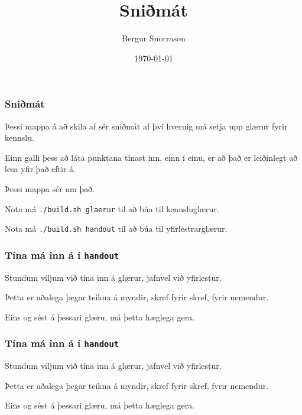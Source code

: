 \title{Sniðmát}
\author{Bergur Snorrason}
\date{\today}



\frame{\titlepage}

{
	\frametitle{Sniðmát}
	{
		\item<1-> Þessi mappa á að skila af sér sniðmát af því hvernig má setja upp glærur fyrir kennslu.
		\item<2-> Einn galli þess að láta punktana tínast inn, einn í einu, er að það er leiðinlegt að lesa yfir það eftir á.
		\item<3-> Þessi mappa sér um það.
		\item<4-> Nota má \texttt{./build.sh glaerur} til að búa til kennsluglærur.
		\item<5-> Nota má \texttt{./build.sh handout} til að búa til yfirlestrarglærur.
	}
}

{
	\frametitle{Tína má inn á í \texttt{handout}}
	{
		\item<all:1-> Stundum viljum við tína inn á glærur, jafnvel við yfirlestur.
		\item<all:2-> Þetta er aðalega þegar teikna á myndir, skref fyrir skref, fyrir nemendur.
		\item<all:3-> Eins og sést á þessari glæru, má þetta hæglega gera.
	}
}

{
	\frametitle{Tína má inn á í \texttt{handout}}
	{
		\item<all:1-> Stundum viljum við tína inn á glærur, jafnvel við yfirlestur.
		\item<all:2-> Þetta er aðalega þegar teikna á myndir, skref fyrir skref, fyrir nemendur.
		\item<all:3-> Eins og sést á þessari glæru, má þetta hæglega gera.
	}
}


